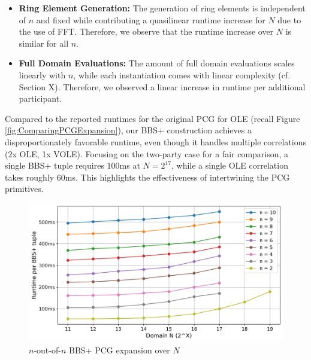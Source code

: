 \begin{itemize}
    \item \textbf{Ring Element Generation:} The generation of ring elements is independent of $n$ and fixed while contributing a quasilinear runtime increase for $N$ due to the use of FFT. Therefore, we observe that the runtime increase over $N$ is similar for all $n$.
    \item \textbf{Full Domain Evaluations:} The amount of full domain evaluations scales linearly with $n$, while each instantiation comes with linear complexity (cf. Section X). Therefore, we observed a linear increase in runtime per additional participant.
\end{itemize}

Compared to the reported runtimes for the original PCG for OLE (recall Figure \ref{fig:ComparingPCGExpansion}), our BBS+ construction achieves a disproportionately favorable runtime, even though it handles multiple correlations (2x OLE, 1x VOLE). Focusing on the two-party case for a fair comparison, a single BBS+ tuple requires $100$ms at $N=2^{17}$, while a single OLE correlation takes roughly $60$ms. This highlights the effectiveness of intertwining the PCG primitives.

\begin{figure}[t]
    \centering
    \includegraphics[scale=0.49]{images/plots/bbs_pcg_NoutofN.png}
    \caption{$n$-out-of-$n$ BBS+ PCG expansion over $N$}
    \label{fig:BBSnoutofn}
\end{figure}

